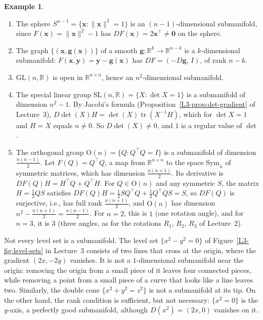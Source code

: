 \documentclass[11pt]{article}
\newcommand{\norm}[1]{\lVert #1 \rVert}
\theoremstyle{definition}
\newtheorem{example}[definition]{Example}
\theoremstyle{plain}
\theoremstyle{remark}
\DeclareMathOperator{\tr}{tr}
\begin{document}
\begin{example}\label{ex:submanifolds}
    \begin{enumerate}
        \item The sphere $S^{n-1} = \{\mathbf{x} : \norm{\mathbf{x}}^2 = 1\}$ is an $(n - 1)$-dimensional submanifold, since $F(\mathbf{x}) = \norm{\mathbf{x}}^2 - 1$ has $DF(\mathbf{x}) = 2\mathbf{x}^\top \neq \mathbf{0}$ on the sphere.
        \item The graph $\{(\mathbf{x}, \mathbf{g}(\mathbf{x}))\}$ of a smooth $\mathbf{g}: \mathbb{R}^k \to \mathbb{R}^{n-k}$ is a $k$-dimensional submanifold: $F(\mathbf{x}, \mathbf{y}) = \mathbf{y} - \mathbf{g}(\mathbf{x})$ has $DF = (-D\mathbf{g}, \, I)$, of rank $n - k$.
        \item $\mathrm{GL}(n, \mathbb{R})$ is open in $\mathbb{R}^{n \times n}$, hence an $n^2$-dimensional submanifold.
        \item The special linear group $\mathrm{SL}(n, \mathbb{R}) = \{X : \det X = 1\}$ is a submanifold of dimension $n^2 - 1$. By Jacobi's formula (Proposition~\ref{L3-prop:det-gradient} of Lecture~3), $D\det(X)H = \det(X)\tr(X^{-1}H)$, which for $\det X = 1$ and $H = X$ equals $n \neq 0$. So $D\det(X) \neq 0$, and $1$ is a regular value of $\det$.
        \item The orthogonal group $\mathrm{O}(n) = \{Q : Q^\top Q = I\}$ is a submanifold of dimension $\frac{n(n-1)}{2}$. Let $F(Q) = Q^\top Q$, a map from $\mathbb{R}^{n \times n}$ to the space $\mathrm{Sym}_n$ of symmetric matrices, which has dimension $\frac{n(n+1)}{2}$. Its derivative is $DF(Q)H = H^\top Q + Q^\top H$. For $Q \in \mathrm{O}(n)$ and any symmetric $S$, the matrix $H = \frac{1}{2}QS$ satisfies $DF(Q)H = \frac{1}{2}SQ^\top Q + \frac{1}{2}Q^\top QS = S$, so $DF(Q)$ is surjective, i.e., has full rank $\frac{n(n+1)}{2}$, and $\mathrm{O}(n)$ has dimension $n^2 - \frac{n(n+1)}{2} = \frac{n(n-1)}{2}$. For $n = 2$, this is $1$ (one rotation angle), and for $n = 3$, it is $3$ (three angles, as for the rotations $R_1$, $R_2$, $R_3$ of Lecture~2).
    \end{enumerate}
\end{example}

Not every level set is a submanifold. The level set $\{x^2 - y^2 = 0\}$ of Figure~\ref{L3-fig:level-sets} in Lecture~3 consists of two lines that cross at the origin, where the gradient $(2x, -2y)$ vanishes. It is not a $1$-dimensional submanifold near the origin: removing the origin from a small piece of it leaves four connected pieces, while removing a point from a small piece of a curve that looks like a line leaves two. Similarly, the double cone $\{x^2 + y^2 = z^2\}$ is not a submanifold at its tip. On the other hand, the rank condition is sufficient, but not necessary: $\{x^2 = 0\}$ is the $y$-axis, a perfectly good submanifold, although $D(x^2) = (2x, 0)$ vanishes on it.
\end{document}
